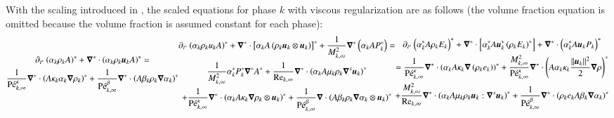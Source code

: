 %
With the scaling introduced in , the scaled equations for phase $k$ with viscous regularization are as follows 
(the volume fraction equation is omitted because the volume fraction is assumed constant for each phase): %
% 
\begin{subequations}\label{eq:sev_equ_case_one_scaled}
%
\begin{multline}\label{eq:sev_equ-with-diss-terms-cont_case_one_scaled}
\partial_{t^*} \left( \alpha_k \rho_k A \right)^* + \grad^* \cdot \left( \alpha_k \rho_k \mbold u_k A \right)^* = \\ \frac{1}{\Pe^\kappa_{k,\infty}}\grad^* \cdot \left(A \kappa_k \alpha_k \grad \rho_k \right)^* +
\frac{1}{\Pe_{k,\infty}^\beta} \grad^* \cdot \left( A \beta_k \rho_k \grad \alpha_k \right)^*
\end{multline}
%
\begin{multline}\label{eq:sev_equ-with-diss-terms-mom_case_one_scaled}
\partial_{t^*} \left( \alpha_k \rho_k u_k A \right)^* + \grad^* \cdot \left[ \alpha_k A \left( \rho_k \mbold u_k \otimes \mbold u_k\right)\right]^* + \frac{1}{M^2_{k,\infty}}\grad^* \left( \alpha_k A P_k^* \right) = \\
  \frac{1}{M^2_{k,\infty}} \alpha_k^* P^*_k \grad^* A^*  
+ \frac{1}{\Re_{k,\infty}}\grad^* \cdot \left( \alpha_k A \mu_k \rho_k \grad^s \mbold u_k \right)^* \\ 
+ \frac{1}{\Pe_{k,\infty}^\kappa} \grad^* \cdot\left( \alpha_k A \kappa_k \grad \rho_k \otimes \mbold u_k \right)^* 
+ \frac{1}{\Pe_{k,\infty}^\beta} \grad \cdot \left( A \beta_k \rho_k \grad \alpha_k \otimes \mbold u_k \right)^*
\end{multline}
%
\begin{multline}\label{eq:sev_equ-with-diss-terms-ener_case_one_scaled}
\partial_{t^*} \left( \alpha_k^* A \rho_k E_k \right)^* + \grad^* \cdot \left[ \alpha_k^* A \mbold u_k^*  \left( \rho_k E_k \right)^* \right] +  \grad^* \cdot \left(\alpha_k^* A \mbold u_k P_k \right)^*  \\ =
\frac{1}{\Pe_{k,\infty}^\kappa} \grad^* \cdot \left( \alpha_k A \kappa_k \grad \left( \rho_k e_k \right) \right)^* 
+ \frac{M^2_{k,\infty}}{\Pe_{k,\infty}^\kappa} \grad^* \cdot \left( A\alpha_k \kappa_k \frac{||\mbold u_k||^2}{2} \grad \rho \right)^*  \\
+ \frac{M^2_{k,\infty}}{\Re_{k,\infty}} \grad^* \cdot \left( \alpha_k A \mu_k \rho_k \mbold u_k : \grad^s \mbold u_k\right)^* 
+ \frac{1}{\Pe_{k,\infty}^\beta } \grad^*\cdot \left( \rho_k e_k A \beta_k \grad \alpha_k \right)^*
\end{multline}
%
\end{subequations}
